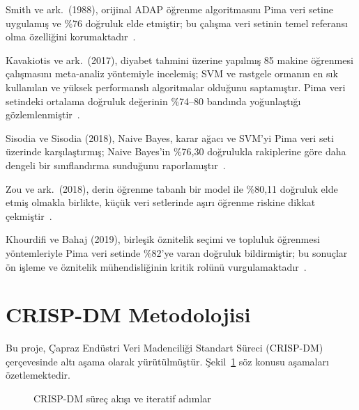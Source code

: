 \documentclass[12pt,a4paper]{article}
\begin{document}
Smith ve ark.\ (1988), orijinal ADAP öğrenme algoritmasını Pima veri setine
uygulamış ve \%76 doğruluk elde etmiştir; bu çalışma veri setinin temel
referansı olma özelliğini korumaktadır~\cite{smith1988using}.

Kavakiotis ve ark.\ (2017), diyabet tahmini üzerine yapılmış 85 makine öğrenmesi
çalışmasını meta-analiz yöntemiyle incelemiş; SVM ve rastgele ormanın en sık
kullanılan ve yüksek performanslı algoritmalar olduğunu saptamıştır. Pima veri
setindeki ortalama doğruluk değerinin \%74--80 bandında yoğunlaştığı
gözlemlenmiştir~\cite{kavakiotis2017machine}.

Sisodia ve Sisodia (2018), Naive Bayes, karar ağacı ve SVM'yi Pima veri seti
üzerinde karşılaştırmış; Naive Bayes'in \%76{,}30 doğrulukla rakiplerine göre
daha dengeli bir sınıflandırma sunduğunu raporlamıştır~\cite{sisodia2018prediction}.

Zou ve ark.\ (2018), derin öğrenme tabanlı bir model ile \%80{,}11 doğruluk
elde etmiş olmakla birlikte, küçük veri setlerinde aşırı öğrenme riskine
dikkat çekmiştir~\cite{zou2018predicting}.

Khourdifi ve Bahaj (2019), birleşik öznitelik seçimi ve topluluk öğrenmesi
yöntemleriyle Pima veri setinde \%82'ye varan doğruluk bildirmiştir; bu
sonuçlar ön işleme ve öznitelik mühendisliğinin kritik rolünü
vurgulamaktadır~\cite{khourdifi2019heart}.

\section{CRISP-DM Metodolojisi}

Bu proje, Çapraz Endüstri Veri Madenciliği Standart Süreci (CRISP-DM)
çerçevesinde altı aşama olarak yürütülmüştür. Şekil~\ref{fig:crispdm} söz konusu
aşamaları özetlemektedir.

\begin{figure}[H]
\centering
{}
\caption{CRISP-DM süreç akışı ve iteratif adımlar}
\label{fig:crispdm}
\end{figure}
\end{document}
